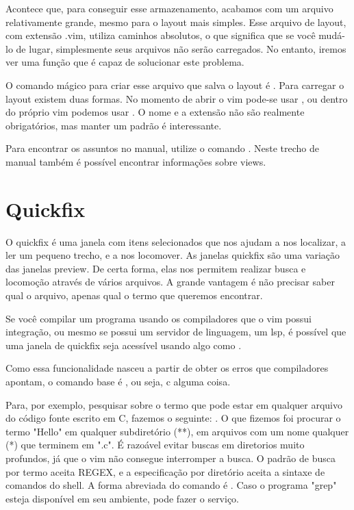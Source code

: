 Acontece que, para conseguir esse armazenamento, acabamos com um arquivo relativamente grande,
mesmo para o layout mais simples.
Esse arquivo de layout, com extensão .vim, utiliza caminhos absolutos,
o que significa que se você mudá-lo de lugar, simplesmente seus arquivos não serão carregados.
No entanto, iremos ver uma função que é capaz de solucionar este problema.

O comando mágico para criar esse arquivo que salva o layout é .
Para carregar o layout existem duas formas.
No momento de abrir o vim pode-se usar , ou dentro do próprio vim
podemos usar .
O nome e a extensão não são realmente obrigatórios, mas manter um padrão é interessante.

Para encontrar os assuntos no manual, utilize o comando .
Neste trecho de manual também é possível encontrar informações sobre views.

\section{Quickfix}
O quickfix é uma janela com itens selecionados que nos ajudam a nos localizar, a ler um pequeno trecho, e a nos locomover.
As janelas quickfix são uma variação das janelas preview.
De certa forma, elas nos permitem realizar busca e locomoção através de vários arquivos.
A grande vantagem é não precisar saber qual o arquivo, apenas qual o termo que queremos encontrar.

Se você compilar um programa usando os compiladores que o vim possui integração, ou mesmo se possui um servidor de linguagem,
um lsp, é possível que uma janela de quickfix seja acessível usando algo como .

Como essa funcionalidade nasceu a partir de obter os erros que compiladores apontam, o comando base é , ou seja,
c alguma coisa.

Para, por exemplo, pesquisar sobre o termo  que pode estar em qualquer
arquivo do código fonte escrito em C, fazemos o seguinte: .
O que fizemos foi procurar o termo "Hello" em qualquer subdiretório (**), em arquivos com um nome qualquer (*)
que terminem em ".c".
É razoável evitar buscas em diretorios muito profundos, já que o vim não consegue interromper a busca.
O padrão de busca por termo aceita REGEX, e a especificação por diretório aceita a sintaxe de comandos do shell.
A forma abreviada do comando  é .
Caso o programa "grep" esteja disponível em seu ambiente,  pode fazer o serviço.

